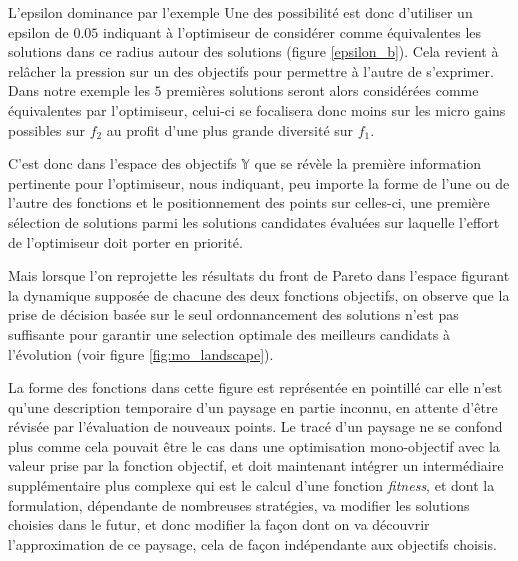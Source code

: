 \begin{testiv}{L'epsilon dominance par l'exemple}{}
Une des possibilité est donc d'utiliser un epsilon de $0.05$ indiquant à l'optimiseur de considérer comme équivalentes les solutions dans ce radius autour des solutions (figure \ref{epsilon_b}). Cela revient à relâcher la pression sur un des objectifs pour permettre à l'autre de s'exprimer. Dans notre exemple les $5$ premières solutions seront alors considérées comme équivalentes par l'optimiseur, celui-ci se focalisera donc moins sur les micro gains possibles sur $f_{2}$ au profit d'une plus grande diversité sur $f_{1}$.
 
\end{testiv}

C'est donc dans l'espace des objectifs $\mathbb{Y}$ que se révèle la première information pertinente pour l'optimiseur, nous indiquant, peu importe la forme de l'une ou de l'autre des fonctions et le positionnement des points sur celles-ci, une première sélection de solutions parmi les solutions candidates évaluées sur laquelle l'effort de l'optimiseur doit porter en priorité.

Mais lorsque l'on reprojette les résultats du front de Pareto dans l'espace figurant la dynamique supposée de chacune des deux fonctions objectifs, on observe que la prise de décision basée sur le seul ordonnancement des solutions n'est pas suffisante pour garantir une selection optimale des meilleurs candidats à l'évolution (voir figure \ref{fig:mo_landscape}).

La forme des fonctions dans cette figure est représentée en pointillé car elle n'est qu'une description temporaire d'un paysage en partie inconnu, en attente d'être révisée par l'évaluation de nouveaux points. Le tracé d'un paysage ne se confond plus comme cela pouvait être le cas dans une optimisation mono-objectif avec la valeur prise par la fonction objectif, et doit maintenant intégrer un intermédiaire supplémentaire plus complexe qui est le calcul d'une fonction \textit{fitness}, et dont la formulation, dépendante de nombreuses stratégies, va modifier les solutions choisies dans le futur, et donc modifier la façon dont on va découvrir l'approximation de ce paysage, cela de façon indépendante aux objectifs choisis. \autocite{Weise2011}

